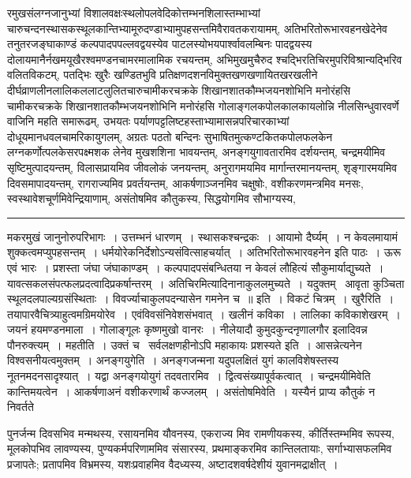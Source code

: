 \documentclass[11pt, openany]{book}
\begin{document}
\newpage

\noindent
रमुखसंलग्नजानुभ्यां विशालवक्षःस्थलोपलवेदिकोत्तम्भनशिलास्तम्भाभ्यां चारुचन्दनस्थासकस्थूलकान्तिभ्यामूरुदण्डाभ्यामुपहसन्तमिवैरावतकरायामम्, अतिभरितोरूभारवहनखेदेनेव तनुतरजङ्घाकाण्डं कल्पपादपपल्लवद्वयस्येव पाटलस्योभयपार्श्वावलम्बिनः पादद्वयस्य दोलायमानैर्नखमयूखैरश्वमण्डनचामरमालामिक रचयन्तम्, अभिमुखमुचैरुद श्चद्भिरतिचिरमुपरिविश्रान्यद्भिरिव वलितविकटम्, पतद्भिः खुरैः खण्डितभुवि प्रतिक्षणदशनविमुक्तखणखणायितखरखलीने दीर्घव्राणलीनलालिकललाटलुलितचारुचामीकरचक्रके शिखानशातकौम्भजयनशोभिनि मनोरंहसि चामीकरचक्रके शिखानशातकौम्भजयनशोभिनि मनोरंहसि गोलाङ्गलकपोलकालकायलोन्नि नीलसिन्धुवारवर्णे वाजिनि महति समारूढम्, उभयतः पर्याणपट्टलिष्टहस्ताभ्यामासन्नपरिचारकाभ्यां दोधूयमानधवलचामरिकायुगलम्, अग्रतः पठतो बन्दिनः सुभाषितमुत्कण्टकितकपोलफलकेन लग्नकर्णोत्पलकेसरपक्ष्मशक लेनेव मुखशशिना भावयन्तम्, अनङ्गयुगावतारमिव दर्शयन्तम्, चन्द्रमयीमिव सृष्टिमुत्पादयन्तम्, विलासप्रायमिव जीवलोकं जनयन्तम्, अनुरागमयमिव मार्गान्तरमानयन्तम्, शृङ्गारमयमिव दिवसमापादयन्तम्, रागराज्यमिव प्रवर्तयन्तम्, आकर्षणाञ्जनमिव चक्षुषोः, वशीकरणमन्त्रमिव मनसः, स्वस्थावेशचूर्णमिवेन्द्रियाणाम्, असंतोषमिव कौतुकस्य, सिद्धयोगमिव सौभाग्यस्य,

\vspace{2mm}
\hrule

\noindent
{\s मकरमुखं जानुनोरुपरिभागः~। उत्तम्भनं धारणम्~। स्थासकश्चन्द्रकः~। आयामो दैर्घ्यम्~। न केवलमायामं शुक्कत्वमप्युपहसन्तम्~। धर्मयोरेकनिर्देशोऽन्यसंवित्साहचर्यात्~। {\qt अतिभरितोरूभारवहनेन} इति पाठः~। ऊरू एवं भारः~। प्रशस्ता जंघा जंघाकाण्डम्~। कल्पपादपसंबन्धितया न केवलं लौहित्यं सौकुमार्याद्युच्यते~। यावत्सकलसंपत्फलप्रदत्वादिप्रकर्षान्तरम्~। अतिचिरमित्यादिनानाकुललमुच्यते~। यदुक्तम् \textendash\ {\qt आवृता कुञ्चिता स्थूलदलपाल्यग्रसंस्थिताः~। विवर्ज्याचाकुलपदन्यासेन गमनेन च~॥} इति~। विकटं चित्रम्~। {\qtt खुरैरिति}~। तयापारवैचित्र्याहुत्वमग्रिमयोरेव~। एवंविवसंनिवेशसंभवात्~। खलीनं कविका~। लालिका कविकाशेखरम्~। जयनं हयमण्डनमाला~। गोलाङ्गूलः कृष्णमुखो वानरः~। नीलेयादौ कुमुदकुन्दनृणालगौर इलादिवन्न पौनरुक्त्यम्~। {\qtt महतीति}~। उक्तं च \textendash\ {\qt सर्वलक्षणहीनोऽपि महाकायः प्रशस्यते} इति~। आसन्नेत्यनेन विश्वसनीयत्वमुक्तम्~। {\qtt अनङ्गयुगेति}~। अनङ्गजन्मना यदुपलक्षितं युगं कालविशेषस्तस्य नूतनमदनसादृश्यात्~। यद्वा अनङ्गयोयुगं तदवतारमिव~। द्वित्वसंख्यापूर्वकत्वात्~। चन्द्रमयीमिवेति कान्तिमयत्वेन~। आकर्षणाअनं वशीकरणार्थं कज्जलम्~। {\qtt असंतोषमिवेति}~। यस्यैनं प्राप्य कौतुकं न निवर्तते}

\newpage

\noindent
पुनर्जन्म दिवसभिव मन्मथस्य, रसायनमिव यौवनस्य, एकराज्य मिव रामणीयकस्य, कीर्तिस्तम्भमिव रूपस्य, मूलकोपभिव लावण्यस्य, पुण्यकर्मपरिणाममिव संसारस्य, प्रथमाङ्करमिव कान्तिलतायाः, सर्गाभ्यासफलमिव प्रजापतेः; प्रतापमिव विभ्रमस्य, यशःप्रवाहमिव वैदध्यस्य, अष्टादशवर्षदेशीयं युवानमद्राक्षीत्~।
\end{document}
